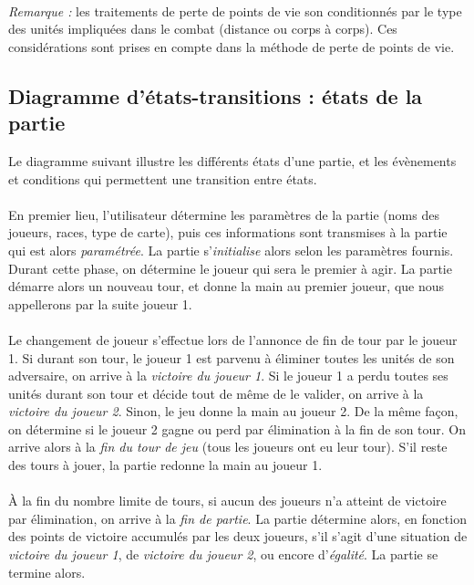 \documentclass[a4paper]{article}
\begin{document}
\paragraph{}
\textit{Remarque : }les traitements de perte de points de vie son conditionnés par le type des unités impliquées dans le combat (distance ou corps à corps). Ces considérations sont prises en compte dans la méthode de perte de points de vie.



\subsection{Diagramme d'états-transitions : états de la partie}
\label{DET}
Le diagramme suivant illustre les différents états d'une partie, et les évènements et conditions qui permettent une transition entre états.

\paragraph{}
En premier lieu, l'utilisateur détermine les paramètres de la partie (noms des joueurs, races, type de carte), puis ces informations sont transmises à la partie qui est alors \textit{paramétrée}. La partie s'\textit{initialise} alors selon les paramètres fournis. Durant cette phase, on détermine le joueur qui sera le premier à agir. La partie démarre alors un nouveau tour, et donne la main au premier joueur, que nous appellerons par la suite joueur 1.

\paragraph{}
Le changement de joueur s'effectue lors de l'annonce de fin de tour par le joueur 1. Si durant son tour, le joueur 1 est parvenu à éliminer toutes les unités de son adversaire, on arrive à la \textit{victoire du joueur 1}. Si le joueur 1 a perdu toutes ses unités durant son tour et décide tout de même de le valider, on arrive à la \textit{victoire du joueur 2}. Sinon, le jeu donne la main au joueur 2. De la même façon, on détermine si le joueur 2 gagne ou perd par élimination à la fin de son tour. On arrive alors à la \textit{fin du tour de jeu} (tous les joueurs ont eu leur tour). S'il reste des tours à jouer, la partie redonne la main au joueur 1.

\paragraph{}
À la fin du nombre limite de tours, si aucun des joueurs n'a atteint de victoire par élimination, on arrive à la \textit{fin de partie}. La partie détermine alors, en fonction des points de victoire accumulés par les deux joueurs, s'il s'agit d'une situation de \textit{victoire du joueur 1}, de \textit{victoire du joueur 2}, ou encore d'\textit{égalité}. La partie se termine alors.


\end{document}
